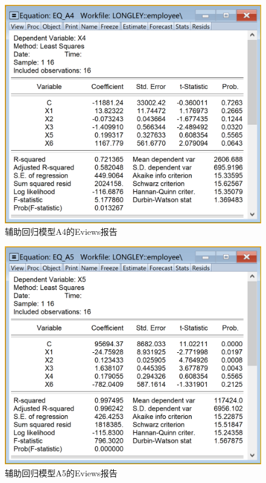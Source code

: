 \documentclass[12pt,(landscape,a4paper),(portrait,a4paper)]{article}
\begin{document}
\begin{figure}

{\centering \includegraphics[width=8in]{picture/lab5-multilinearity/3-A4} 

}

\caption{辅助回归模型A4的Eviews报告}\label{fig:fig-A4}
\end{figure}

\begin{figure}

{\centering \includegraphics[width=8in]{picture/lab5-multilinearity/3-A5} 

}

\caption{辅助回归模型A5的Eviews报告}\label{fig:fig-A5}
\end{figure}
\end{document}
